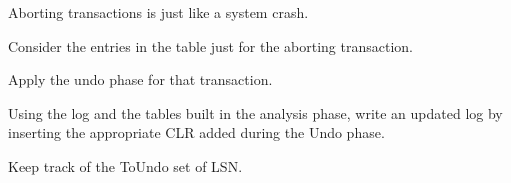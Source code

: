 \documentclass{beamer}
\begin{document}
\begin{slide}{
	\item Aborting transactions is just like a system crash.
	\item Consider the entries in the table just for the aborting transaction.
	\item Apply the undo phase for that transaction.
}\end{slide}

\begin{slide}{
	\item Using the log and the tables built in the analysis phase, write an updated log by inserting the appropriate CLR added during the Undo phase.
	\item Keep track of the ToUndo set of LSN.
}\end{slide}
\end{document}
